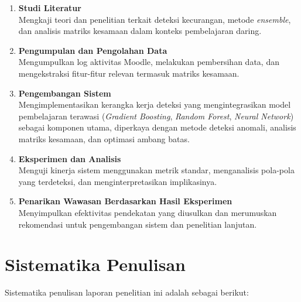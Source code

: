 \begin{enumerate}
\item \textbf{Studi Literatur}\\
Mengkaji teori dan penelitian terkait deteksi kecurangan, metode \textit{ensemble}, dan analisis matriks kesamaan dalam konteks pembelajaran daring.

\item \textbf{Pengumpulan dan Pengolahan Data}\\
Mengumpulkan log aktivitas Moodle, melakukan pembersihan data, dan mengekstraksi fitur-fitur relevan termasuk matriks kesamaan.

\item \textbf{Pengembangan Sistem}\\
Mengimplementasikan kerangka kerja deteksi yang mengintegrasikan model pembelajaran terawasi (\textit{Gradient Boosting}, \textit{Random Forest}, \textit{Neural Network}) sebagai komponen utama, diperkaya dengan metode deteksi anomali, analisis matriks kesamaan, dan optimasi ambang batas.

\item \textbf{Eksperimen dan Analisis}\\
Menguji kinerja sistem menggunakan metrik standar, menganalisis pola-pola yang terdeteksi, dan menginterpretasikan implikasinya.

\item \textbf{Penarikan Wawasan Berdasarkan Hasil Eksperimen}\\
Menyimpulkan efektivitas pendekatan yang diusulkan dan merumuskan rekomendasi untuk pengembangan sistem dan penelitian lanjutan.
\end{enumerate}

\section{Sistematika Penulisan}
\label{sec:sistematikaPenulisan}

Sistematika penulisan laporan penelitian ini adalah sebagai berikut:

